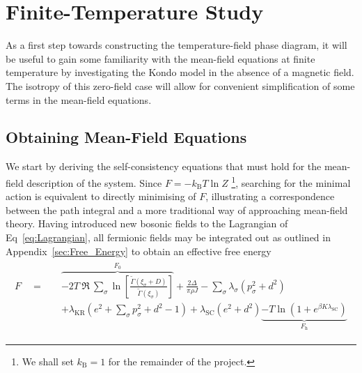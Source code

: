 \documentclass[12pt]{article}
\begin{document}

\section{Finite-Temperature Study}

As a first step towards constructing the temperature-field phase diagram, it will be useful to gain some familiarity with the mean-field equations at finite temperature by investigating the Kondo model in the absence of a magnetic field. The isotropy of this zero-field case will allow for convenient simplification of some terms in the mean-field equations.

\subsection{Obtaining Mean-Field Equations}

We start by deriving the self-consistency equations that must hold for the mean-field description of the system. Since $ F = - k_{\text{B}} T \ln{Z} $ \footnote{We shall set $ k_{\text{B}} = 1 $ for the remainder of the project.}, searching for the minimal action is equivalent to directly minimising of $ F $, illustrating a correspondence between the path integral and a more traditional way of approaching mean-field theory. Having introduced new bosonic fields to the Lagrangian of Eq~\eqref{eq:Lagrangian}, all fermionic fields may be integrated out as outlined in Appendix~\ref{sec:Free_Energy} to obtain an effective free energy
\begin{align}
\begin{split}
F \quad = \quad & \overbrace{- 2 T~\Re~{\sum_{\sigma}\ln{\left[\frac{\widetilde{\Gamma}(\xi_{\sigma} + D)}{\widetilde{\Gamma}(\xi_{\sigma})} \right]}}}^{F_0} + \frac{2 \Delta}{\pi \rho J} - \sum_{\sigma} \lambda_{\sigma} (p_{\sigma}^2 + d^2)\\
&+ \lambda_{\text{KR}} (e^2 + \sum_{\sigma} p_{\sigma}^2 + d^2 - 1) + \lambda_{\text{SC}} (e^2 + d^2) \underbrace{- T \ln{\left( 1 + e^{\beta K \lambda_{\text{SC}}} \right)}}_{F_{\text{h}}}
\label{eq:Free_Energy}
\end{split}
\end{align}
\end{document}
